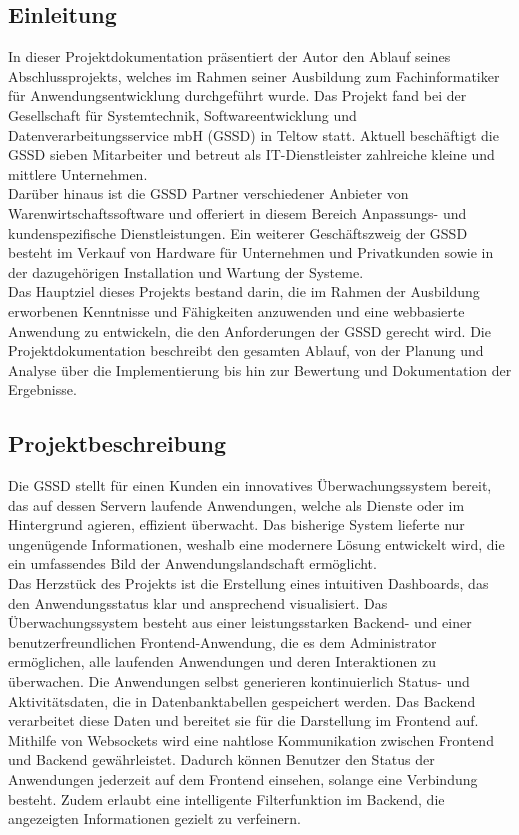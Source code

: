 \begin{flushleft}
	\setcounter{page}{1}
	\section{Einleitung}
	In dieser Projektdokumentation präsentiert der Autor den Ablauf seines Abschlussprojekts, welches im Rahmen seiner Ausbildung zum Fachinformatiker für Anwendungsentwicklung durchgeführt wurde. Das Projekt fand bei der Gesellschaft für Systemtechnik, Softwareentwicklung und Datenverarbeitungsservice mbH (\acs{GSSD}) in Teltow statt. Aktuell beschäftigt die \acs{GSSD} sieben Mitarbeiter und betreut als IT-Dienstleister zahlreiche kleine und mittlere Unternehmen.
	\\
	Darüber hinaus ist die \acs{GSSD} Partner verschiedener Anbieter von Warenwirtschaftssoftware und offeriert in diesem Bereich Anpassungs- und kundenspezifische Dienstleistungen. Ein weiterer Geschäftszweig der \acs{GSSD} besteht im Verkauf von Hardware für Unternehmen und Privatkunden sowie in der dazugehörigen Installation und Wartung der Systeme.
	\\
	Das Hauptziel dieses Projekts bestand darin, die im Rahmen der Ausbildung erworbenen Kenntnisse und Fähigkeiten anzuwenden und eine webbasierte Anwendung zu entwickeln, die den Anforderungen der \acs{GSSD} gerecht wird. Die Projektdokumentation beschreibt den gesamten Ablauf, von der Planung und Analyse über die Implementierung bis hin zur Bewertung und Dokumentation der Ergebnisse.

	\subsection{Projektbeschreibung}
	Die \acs{GSSD} stellt für einen Kunden ein innovatives Überwachungssystem bereit, das auf dessen Servern laufende Anwendungen, welche als Dienste oder im Hintergrund agieren, effizient überwacht. Das bisherige System lieferte nur ungenügende Informationen, weshalb eine modernere Lösung entwickelt wird, die ein umfassendes Bild der Anwendungslandschaft ermöglicht.
	\\
	Das Herzstück des Projekts ist die Erstellung eines intuitiven Dashboards, das den Anwendungsstatus klar und ansprechend visualisiert. Das Überwachungssystem besteht aus einer leistungsstarken Backend- und einer benutzerfreundlichen Frontend-Anwendung, die es dem Administrator ermöglichen, alle laufenden Anwendungen und deren Interaktionen zu überwachen. Die Anwendungen selbst generieren kontinuierlich Status- und Aktivitätsdaten, die in Datenbanktabellen gespeichert werden. Das Backend verarbeitet diese Daten und bereitet sie für die Darstellung im Frontend auf.
	\\
	Mithilfe von Websockets wird eine nahtlose Kommunikation zwischen Frontend und Backend gewährleistet. Dadurch können Benutzer den Status der Anwendungen jederzeit auf dem Frontend einsehen, solange eine Verbindung besteht. Zudem erlaubt eine intelligente Filterfunktion im Backend, die angezeigten Informationen gezielt zu verfeinern.


\end{flushleft}
